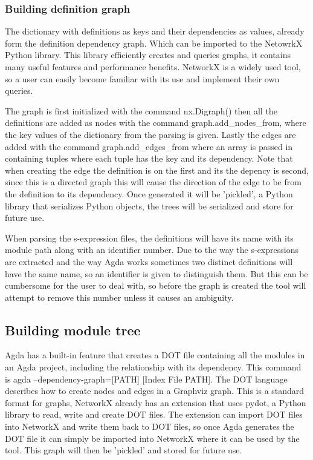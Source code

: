 \subsubsection{Building definition graph}

The dictionary with definitions as keys and their dependencies as values,
already form the definition dependency graph. Which can be imported to the
NetowrkX Python library. This library efficiently creates and queries graphs,
it contains many useful features and performance benefits. NetworkX is a widely
used tool, so a user can easily become familiar with its use and implement their
own queries. 

The graph is first initialized with the command \textsf{nx.Digraph()} then all
the definitions are added as nodes with the command
\textsf{graph.add\_nodes\_from}, where the key values of the dictionary from
the parsing is given. Lastly the edges are added with the command
\textsf{graph.add\_edges\_from} where an array is passed in containing tuples
where each tuple has the key and its dependency. Note that when creating the
edge the definition is on the first and its the depency is second, since this
is a directed graph this will cause the direction of the edge to be from the
definition to its dependency.  Once generated it will be 'pickled', a Python
library that serializes Python objects, the trees will be serialized and store
for future use. 

When parsing the s-expression files, the definitions will have its name with
its module path along with an identifier number. Due to the way the
s-expressions are extracted and the way Agda works sometimes two distinct
definitions will have the same name, so an identifier is given to distinguish
them. But this can be cumbersome for the user to deal with, so before the graph
is created the tool will attempt to remove this number unless it causes an
ambiguity.

\subsection{Building module tree} \label{sub: Building Module Tree}

Agda has a built-in feature that creates a DOT file containing all the modules
in an Agda project, including the relationship with its dependency. This
command is \textsf{agda --dependency-graph=[PATH] [Index File PATH]}. The DOT
language describes how to create nodes and edges in a Graphviz graph. This is a
standard format for graphs, NetworkX already has an extension that uses pydot,
a Python library to read, write and create DOT files. The extension can import
DOT files into NetworkX and write them back to DOT files, so once Agda
generates the DOT file it can simply be imported into NetworkX where it can be
used by the tool. This graph will then be 'pickled' and stored for future use.

